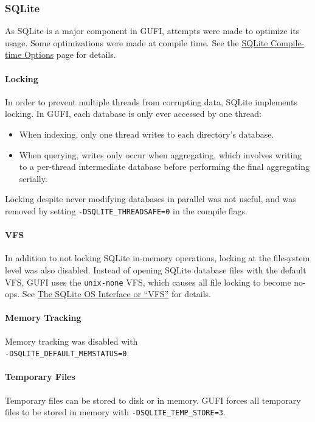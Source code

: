 \subsubsection{SQLite}
As SQLite is a major component in GUFI, attempts were made to optimize
its usage. Some optimizations were made at compile time. See the
\href{https://www.sqlite.org/compile.html}{SQLite Compile-time
  Options} page for details.

\paragraph{Locking}
In order to prevent multiple threads from corrupting data, SQLite
implements locking. In GUFI, each database is only ever accessed by
one thread:

\begin{itemize}
\item When indexing, only one thread writes to each directory's
  database.
\item When querying, writes only occur when aggregating, which
  involves writing to a per-thread intermediate database before
  performing the final aggregating serially.
\end{itemize}

Locking despite never modifying databases in parallel was not useful,
and was removed by setting \texttt{-DSQLITE\_THREADSAFE=0} in the
compile flags.

\paragraph{VFS}
In addition to not locking SQLite in-memory operations, locking at the
filesystem level was also disabled. Instead of opening SQLite database
files with the default VFS, GUFI uses the \texttt{unix-none} VFS,
which causes all file locking to become no-ops. See
\href{https://www.sqlite.org/vfs.html}{The SQLite OS Interface or
  ``VFS''} for details.

\paragraph{Memory Tracking}
Memory tracking was disabled with \\
\noindent \texttt{-DSQLITE\_DEFAULT\_MEMSTATUS=0}.

\paragraph{Temporary Files}
Temporary files can be stored to disk or in memory. GUFI forces all
temporary files to be stored in memory with
\texttt{-DSQLITE\_TEMP\_STORE=3}.

